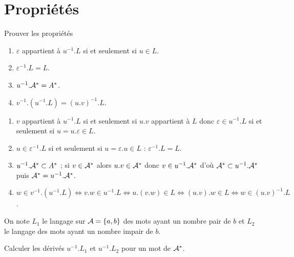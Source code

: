 \section{Propriétés}
\begin{Exercise}[title = Première propriétés]

Prouver les propriétés

\begin{enumerate}
\item $\varepsilon$ appartient à $u^{-1}.L$ si et seulement si $u \in L$.
\item $\varepsilon^{-1}. L = L$.
\item $u^{-1}.{\cal A}^* = A^*$.
\item $v^{-1}.(u^{-1}.L) = (u.v)^{-1}.L$.
\end{enumerate}
\end{Exercise}
\begin{Answer}
\begin{enumerate}
\item $v$ appartient à $u^{-1}.L$ si et seulement si $u.v$ appartient à $L$ donc $\varepsilon\in u^{-1}.L$ si et seulement si $u = u.\varepsilon\in L$.

\item $u \in \varepsilon^{-1}.L$ si et seulement si $u = \varepsilon.u \in L$ : $\varepsilon^{-1}.L = L$.

\item $u^{-1}.{\cal A}^* \subset A^*$ ; si $v\in {\cal A}^*$ alors $u.v\in {\cal A}^*$ donc $v\in u^{-1}.{\cal A}^*$ d'où ${\cal A}^* \subset u^{-1}.{\cal A}^*$ puis ${\cal A}^* = u^{-1}.{\cal A}^*$.

\item $w \in v^{-1}.(u^{-1}. L)
\iff v.w \in u^{-1}.L
\iff u.(v.w) \in L
\iff (u.v).w \in L
\iff w \in (u.v)^{-1}.L$.
\end{enumerate}
\end{Answer}
\begin{Exercise}[title = Un exemple]

On note $L_1$ le langage sur ${\cal A}=\{a,b\}$ des mots ayant un nombre pair de $b$ et $L_2$ le langage des mots ayant un nombre impair de $b$. 

Calculer les dérivés $u^{-1}.L_1$ et $u^{-1}.L_2$ pour un mot de ${\cal A}^*$.
\end{Exercise}
